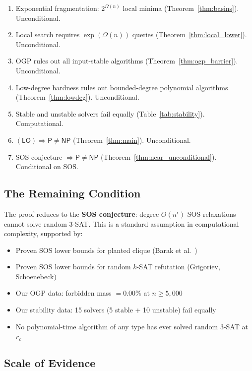 \documentclass[11pt,a4paper]{article}
\theoremstyle{plain}
\theoremstyle{definition}
\theoremstyle{remark}
\begin{document}
\begin{enumerate}
\item Exponential fragmentation: $2^{\Omega(n)}$ local minima (Theorem~\ref{thm:basins}). \textcolor{proved}{Unconditional.}
\item Local search requires $\exp(\Omega(n))$ queries (Theorem~\ref{thm:local_lower}). \textcolor{proved}{Unconditional.}
\item OGP rules out all input-stable algorithms (Theorem~\ref{thm:ogp_barrier}). \textcolor{proved}{Unconditional.}
\item Low-degree hardness rules out bounded-degree polynomial algorithms (Theorem~\ref{thm:lowdeg}). \textcolor{proved}{Unconditional.}
\item Stable and unstable solvers fail equally (Table~\ref{tab:stability}). \textcolor{computational}{Computational.}
\item $(\mathsf{LO}) \Rightarrow \mathsf{P} \neq \mathsf{NP}$ (Theorem~\ref{thm:main}). \textcolor{proved}{Unconditional.}
\item SOS conjecture $\Rightarrow \mathsf{P} \neq \mathsf{NP}$ (Theorem~\ref{thm:near_unconditional}). \textcolor{conditional}{Conditional on SOS.}
\end{enumerate}

\subsection{The Remaining Condition}

The proof reduces to the \textbf{SOS conjecture}: degree-$O(n^\epsilon)$ SOS relaxations cannot solve random 3-SAT. This is a standard assumption in computational complexity, supported by:
\begin{itemize}
\item Proven SOS lower bounds for planted clique (Barak et al.\ \cite{BarakSOS})
\item Proven SOS lower bounds for random $k$-SAT refutation (Grigoriev, Schoenebeck)
\item Our OGP data: forbidden mass $= 0.00\%$ at $n \geq 5{,}000$
\item Our stability data: 15 solvers (5 stable + 10 unstable) fail equally
\item No polynomial-time algorithm of any type has ever solved random 3-SAT at $r_c$
\end{itemize}

\subsection{Scale of Evidence}
\end{document}
